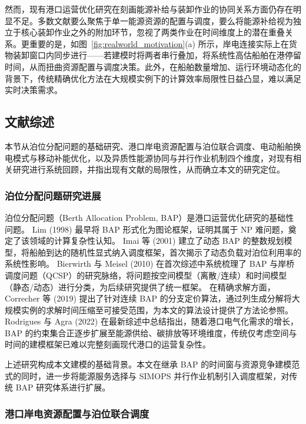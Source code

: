 \documentclass[UTF8, a4paper, 12pt]{ctexart}
\begin{document}
然而，现有港口运营优化研究在刻画能源补给与装卸作业的协同关系方面仍存在明显不足。多数文献要么聚焦于单一能源资源的配置与调度，要么将能源补给视为独立于核心装卸作业之外的附加环节，忽视了两类作业在时间维度上的潜在重叠关系。更重要的是，如图~\ref{fig:realworld_motivation}(a) 所示，岸电连接实际上在货物装卸窗口内同步进行——若建模时将两者串行叠加，将系统性高估船舶在港停留时间，从而扭曲资源配置与调度决策。此外，在船舶数量增加、运行环境动态化的背景下，传统精确优化方法在大规模实例下的计算效率局限性日益凸显，难以满足实时决策需求。
\subsection{文献综述}
\label{sec:lit_review}
 
本节从泊位分配问题的基础研究、港口岸电资源配置与泊位联合调度、电动船舶换电模式与移动补能优化，以及异质性能源协同与并行作业机制四个维度，对现有相关研究进行系统回顾，并指出现有文献的局限性，从而确立本文的研究定位。
 
\subsubsection{泊位分配问题研究进展}
 
泊位分配问题（Berth Allocation Problem, BAP）是港口运营优化研究的基础性问题。
Lim (1998) \cite{Lim1998} 最早将 BAP 形式化为图论框架，证明其属于 NP 难问题，奠定了该领域的计算复杂性认知。
Imai 等 (2001) \cite{Imai2001} 建立了动态 BAP 的整数规划模型，将船舶到达的随机性显式纳入调度框架，首次揭示了动态负载对泊位利用率的系统性影响。
Bierwirth 与 Meisel (2010) \cite{Bierwirth2010} 在首次综述中系统梳理了 BAP 与岸桥调度问题（QCSP）的研究脉络，将问题按空间模型（离散/连续）和时间模型（静态/动态）进行分类，为后续研究提供了统一框架。
在精确求解方面，Correcher 等 (2019) \cite{Correcher2019} 提出了针对连续 BAP 的分支定价算法，通过列生成分解将大规模实例的求解时间压缩至可接受范围，为本文的算法设计提供了方法论参照。
Rodrigues 与 Agra (2022) \cite{Rodrigues2022} 在最新综述中总结指出，随着港口电气化需求的增长，BAP 的约束集合正逐步扩展至能源供给、碳排放等环境维度，传统仅考虑空间与时间的建模框架已难以完整刻画现代港口的运营复杂性。
 
上述研究构成本文建模的基础背景。本文在继承 BAP 的时间窗与资源竞争建模范式的同时，进一步将能源服务选择与 SIMOPS 并行作业机制引入调度框架，对传统 BAP 研究体系进行扩展。
 
\subsubsection{港口岸电资源配置与泊位联合调度}
 
\end{document}
